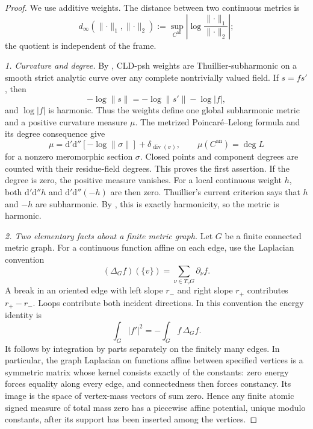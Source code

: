 \begin{proof}
We use additive weights.  The distance between two continuous metrics is
\[
 d_\infty(\lVert\cdot\rVert_1,\lVert\cdot\rVert_2)
  :=\sup_{C^{\mathrm{an}}}
       \left|\log\frac{\lVert\cdot\rVert_1}
                       {\lVert\cdot\rVert_2}\right|;
\]
the quotient is independent of the frame.

\emph{1. Curvature and degree.}
By \cite[\S1.2 and \S4.1.2]{GR25Classical}, CLD-psh weights are
Thuillier-subharmonic on a smooth strict analytic curve over any complete
nontrivially valued field.  If $s=f s'$, then
\[
 -\log\lVert s\rVert=-\log\lVert s'\rVert-\log|f|,
\]
and $\log|f|$ is harmonic.  Thus the weights define one global
subharmonic metric and a positive curvature measure $\mu$.
The metrized Poincar\'e--Lelong formula and its degree consequence
\cite[Theorem~18.1.6 and Corollary~18.1.7]{CLD25} give
\[
 \mu=\mathrm d'\mathrm d''[-\log\lVert\sigma\rVert]
          +\delta_{\operatorname{div}(\sigma)},\qquad
 \mu(C^{\mathrm{an}})=\deg L
\]
for a nonzero meromorphic section $\sigma$.  Closed points and component
degrees are counted with their residue-field degrees.  This proves the
first assertion.  If the degree is zero, the positive measure vanishes.
For a local continuous weight $h$, both $\mathrm d'\mathrm d''h$
and $\mathrm d'\mathrm d''(-h)$ are then zero.  Thuillier's current
criterion \cite[Theorem~3.4.12]{Thu05} says that $h$ and $-h$ are
subharmonic.  By \cite[\S3.12]{GR25Classical}, this is exactly
harmonicity, so the metric is harmonic.

\emph{2. Two elementary facts about a finite metric graph.}
Let $G$ be a finite connected metric graph.  For a continuous function
affine on each edge, use the Laplacian convention
\[
 (\Delta_G f)(\{v\})=\sum_{\nu\in T_vG}\partial_\nu f.
\]
A break in an oriented edge with left slope $r_-$ and right slope
$r_+$ contributes $r_+-r_-$.  Loops contribute both incident
directions.  In this convention the energy identity is
\[
 \int_G |f'|^2=-\int_G f\,\Delta_G f.
\]
It follows by integration by parts separately on the finitely many
edges.  In particular, the graph Laplacian on functions affine between
specified vertices is a symmetric matrix whose kernel consists exactly
of the constants: zero energy forces equality along every edge, and
connectedness then forces constancy.  Its image is the space of
vertex-mass vectors of sum zero.  Hence any finite atomic signed measure
of total mass zero has a piecewise affine potential, unique modulo
constants, after its support has been inserted among the vertices.


\end{proof}
